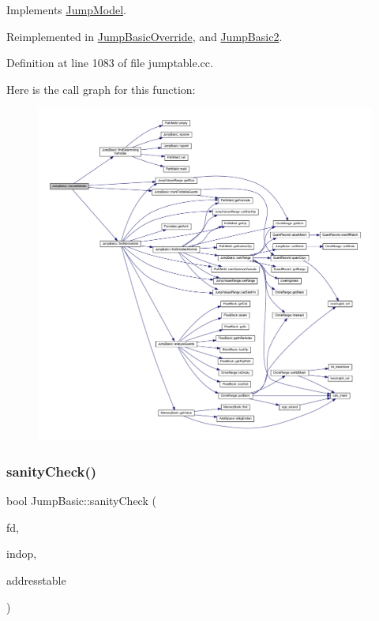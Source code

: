 Implements \mbox{\hyperlink{class_jump_model_a9c2326278dd18c9d78dd5cd5795e802b}{Jump\+Model}}.



Reimplemented in \mbox{\hyperlink{class_jump_basic_override_a4fd706bf7ee1023bd1d93c78ba66852f}{Jump\+Basic\+Override}}, and \mbox{\hyperlink{class_jump_basic2_adc60ecb0d804d1a7754161b38ae3299f}{Jump\+Basic2}}.



Definition at line 1083 of file jumptable.\+cc.

Here is the call graph for this function\+:
\nopagebreak
\begin{figure}[H]
\begin{center}
\leavevmode
\includegraphics[width=350pt]{class_jump_basic_aebf055ad4baf1a138107d8dd3a40c809_cgraph}
\end{center}
\end{figure}
\mbox{\label{class_jump_basic_a1cba6b6c963e4a70efc439c27e53bd44}} 
\subsubsection{\texorpdfstring{sanityCheck()}{sanityCheck()}}
{\footnotesize\ttfamily bool Jump\+Basic\+::sanity\+Check (\begin{DoxyParamCaption}\item[{\mbox{\hyperlink{class_funcdata}{Funcdata}} $\ast$}]{fd,  }\item[{\mbox{\hyperlink{class_pcode_op}{Pcode\+Op}} $\ast$}]{indop,  }\item[{vector$<$ \mbox{\hyperlink{class_address}{Address}} $>$ \&}]{addresstable }\end{DoxyParamCaption})\hspace{0.3cm}{\ttfamily [virtual]}}



